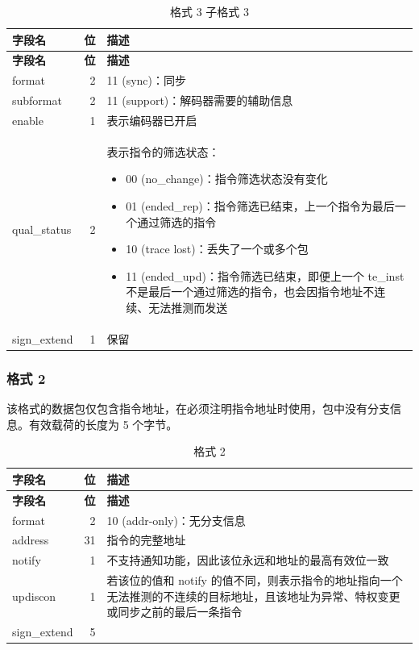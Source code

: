 \documentclass[main\_\_CN.tex]{subfiles}
\begin{document}
\begin{longtable}[c]{ |l|r|L{10cm}| }
    \caption{格式 3 子格式 3}
    \label{tab:f3s3}
    \\\hline{}
    \textbf{字段名} & \textbf{位} & \textbf{描述} \\\hline
    \endfirsthead

    \hline
    \textbf{字段名} & \textbf{位} & \textbf{描述} \\\hline
    \endhead
    \endfoot
    \endlastfoot

    format & 2 & 11 (sync)：同步 \\\hline
    subformat & 2 & 11 (support)：解码器需要的辅助信息 \\\hline
    enable & 1 & 表示编码器已开启 \\\hline
    qual\_status & 2 & 表示指令的筛选状态：
    \begin{itemize}
        \item 00 (no\_change)：指令筛选状态没有变化
        \item 01 (ended\_rep)：指令筛选已结束，上一个指令为最后一个通过筛选的指令
        \item 10 (trace lost)：丢失了一个或多个包
        \item 11 (ended\_upd)：指令筛选已结束，即便上一个 te\_inst 不是最后一个通过筛选的指令，也会因指令地址不连续、无法推测而发送
    \end{itemize}
    \\\hline
    sign\_extend & 1 & 保留 \\\hline

 \end{longtable}




\subsubsection{格式 2}

该格式的数据包仅包含指令地址，在必须注明指令地址时使用，包中没有分支信息。有效载荷的长度为 5 个字节。

\begin{longtable}[c]{ |l|r|L{10cm}| }
    \caption{格式 2}
    \label{tab:f2}
    \\\hline{}
    \textbf{字段名} & \textbf{位} & \textbf{描述} \\\hline
    \endfirsthead
    \textbf{字段名} & \textbf{位} & \textbf{描述} \\\hline
    \endhead
    \endfoot
    \endlastfoot

    format & 2 & 10 (addr-only)：无分支信息 \\\hline
    address & 31 & 指令的完整地址 \\\hline
    notify & 1 & \chipname{} 不支持通知功能，因此该位永远和地址的最高有效位一致 \\\hline
    updiscon & 1 & 若该位的值和 notify 的值不同，则表示指令的地址指向一个无法推测的不连续的目标地址，且该地址为异常、特权变更或同步之前的最后一条指令 \\\hline
    sign\_extend & 5
    &  \\\hline
 \end{longtable}
\end{document}

